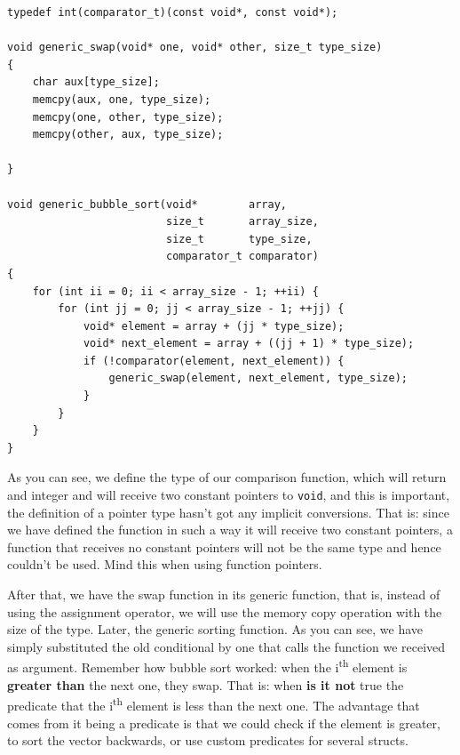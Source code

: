 \documentclass[a4paper]{article}
\begin{document}
\noindent
\begin{minipage}[H]{\linewidth}
\mbox{}
\begin{lstlisting}[style=C,
caption={Generic \texttt{bubble\_sort} definition},
label={lst:bubbleSortGeneric}]
typedef int(comparator_t)(const void*, const void*);

void generic_swap(void* one, void* other, size_t type_size)
{
    char aux[type_size];
    memcpy(aux, one, type_size);
    memcpy(one, other, type_size);
    memcpy(other, aux, type_size);

}

void generic_bubble_sort(void*        array,
                         size_t       array_size,
                         size_t       type_size,
                         comparator_t comparator)
{
    for (int ii = 0; ii < array_size - 1; ++ii) {
        for (int jj = 0; jj < array_size - 1; ++jj) {
            void* element = array + (jj * type_size);
            void* next_element = array + ((jj + 1) * type_size);
            if (!comparator(element, next_element)) {
                generic_swap(element, next_element, type_size);
            }
        }
    }
}
\end{lstlisting}
\end{minipage}

As you can see, we define the type of our comparison function, which will return
and integer and will receive two constant pointers to \verb!void!, and this is
important, the definition of a pointer type hasn't got any implicit conversions.
That is: since we have defined the function in such a way it will receive two
constant pointers, a function that receives no constant pointers will not be
the same type and hence couldn't be used. Mind this when using function
pointers.

After that, we have the swap function in its generic function, that is, instead
of using the assignment operator, we will use the memory copy operation with the
size of the type. Later, the generic sorting function. As you can see, we have
simply substituted the old conditional by one that calls the function we
received as argument. Remember how bubble sort worked: when the
i\textsuperscript{th} element is \textbf{greater than} the next one, they swap.
That is: when \textbf{is it not} true the predicate that the
i\textsuperscript{th} element is less than the next one. The advantage that
comes from it being a predicate is that we could check if the element is
greater, to sort the vector backwards, or use custom predicates for several
structs.
\end{document}
